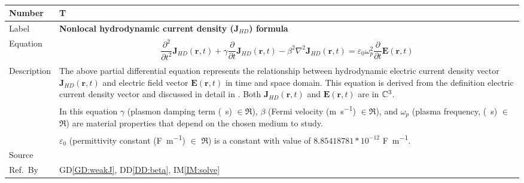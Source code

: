 \documentclass[12pt]{article}
\newcommand{\colBwidth}{0.82\textwidth} \newcommand{\colCwidth}{0.1\textwidth}
\begin{document}
	~\newline \noindent \begin{minipage}{\textwidth}
		\renewcommand*{\arraystretch}{1.5} \begin{tabular}{| p{\colAwidth} |
				p{\colBwidth}|} \hline \rowcolor[gray]{0.9} Number&
			T{theorynum}\thetheorynum \label{TM:J}\\ \hline Label&\bf
			Nonlocal hydrodynamic current density (J$_{HD}$) formula \\ \hline Equation&
			\begin{equation} \label{eq:Jnonlocal} \begin{gathered}
					\dfrac{\partial^{2}}{\partial t^{2}}\textbf{J}_{HD}(\textbf{r},t)	+
					\gamma\dfrac{\partial}{\partial t}\textbf{J}_{HD}(\textbf{r},t) -
					\beta^{2}\nabla^{2}\textbf{J}_{HD}(\textbf{r},t) =
					\varepsilon_{0}\omega^{2}_{p}\dfrac{\partial}{\partial t}
					\textbf{E}(\textbf{r},t) \end{gathered}  \end{equation} \\
			
			
			\hline Description & The above partial differential equation represents the
			relationship between hydrodynamic electric current density vector
			$\textbf{J}_{HD}(\textbf{r},t)$ and electric field vector
			$\textbf{E}(\textbf{r},t)$ in time and space domain. This equation is derived
			from the definition electric current density vector and discussed in detail in
			\cite{hiremath2012numerical}. Both $\textbf{J}_{HD}(\textbf{r},t)$ and
			$\textbf{E}(\textbf{r},t)$ are in $\Bbb C^3$.\\ & In this equation $\gamma$
			(plasmon damping term (\si{\per \second}) $\in \Re$), $\beta$ (Fermi
			velocity (\si{\meter \per \second}) $\in \Re$), and $\omega_p$ (plasma
			frequency, (\si{\per \second}) $\in$ $\Re$) are material properties that
			depend on the chosen medium to study.\\ & $\varepsilon_0$ (permittivity
			constant (\si{\farad \per \meter}) $\in$ $\Re$) is a constant with value of
			$8.85418781*10^{-12}$ \si{\farad \per \meter}. \\ \hline Source &
			\cite{hiremath2012numerical} \\ %
			\hline Ref.\ By & GD\ref{GD:weakJ}, DD\ref{DD:beta}, IM\ref{IM:solve}\\ \hline
	\end{tabular} \end{minipage}\\
	
\end{document}
